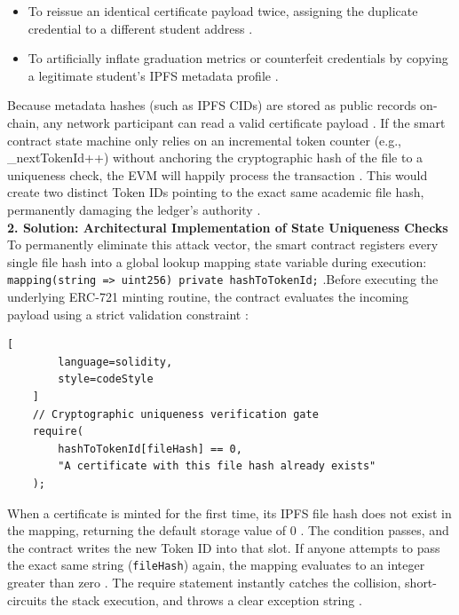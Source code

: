 \begin{itemize}
    \item To reissue an identical certificate payload twice, assigning the duplicate credential to a different student address \cite{khati2023studentcert}.

    \item To artificially inflate graduation metrics or counterfeit credentials by copying a legitimate student's IPFS metadata profile \cite{kumutha2021blockchainacdaemic}.
\end{itemize}

Because metadata hashes (such as IPFS CIDs) are stored as public records on-chain, any network participant can read a valid certificate payload \cite{benet2014ipfs}. If the smart contract state machine only relies on an incremental token counter (e.g., \_nextTokenId++) without anchoring the cryptographic hash of the file to a uniqueness check, the EVM will happily process the transaction \cite{onlinev0835web}. This would create two distinct Token IDs pointing to the exact same academic file hash, permanently damaging the ledger's authority \cite{blockchainineducation}.\\

\textbf{2. Solution: Architectural Implementation of State Uniqueness Checks}\\

To permanently eliminate this attack vector, the smart contract registers every single file hash into a global lookup mapping state variable during execution: \texttt{mapping(string => uint256) private hashToTokenId;} \cite{onlinev0835web}.Before executing the underlying ERC-721 minting routine, the contract evaluates the incoming payload using a strict validation constraint \cite{openzeppelin2026erc721}:

\begin{lstlisting}[
        language=solidity,
        style=codeStyle
    ]
    // Cryptographic uniqueness verification gate
    require(
        hashToTokenId[fileHash] == 0, 
        "A certificate with this file hash already exists"
    );
\end{lstlisting}

When a certificate is minted for the first time, its IPFS file hash does not exist in the mapping, returning the default storage value of 0 \cite{onlinev0835web}. The condition passes, and the contract writes the new Token ID into that slot. If anyone attempts to pass the exact same string (\texttt{fileHash}) again, the mapping evaluates to an integer greater than zero \cite{nfterc721web}. The require statement instantly catches the collision, short-circuits the stack execution, and throws a clear exception string \cite{perez2020smartcontracts}.\\

